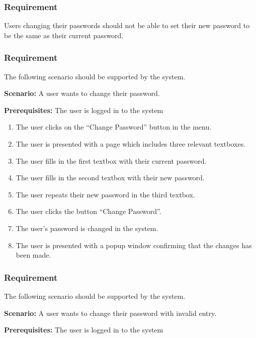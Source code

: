 \documentclass{article}
\begin{document}
\subsubsection{Requirement}
Users changing their passwords should not be able to set their new password to be the same as their current password.

\subsubsection{Requirement}
The following scenario should be supported by the system.

\textbf{Scenario:} A user wants to change their password.

\textbf{Prerequisites:} The user is logged in to the system

\begin{enumerate}
    \item The user clicks on the “Change Password” button in the menu.
    \item The user is presented with a page which includes three relevant textboxes.
    \item The user fills in the first textbox with their current password.
    \item The user fills in the second textbox with their new password.
    \item The user repeats their new password in the third textbox.
    \item The user clicks the button “Change Password”.
    \item The user's password is changed in the system.
    \item The user is presented with a popup window confirming that the changes has been made.
\end{enumerate}



\subsubsection{Requirement}
The following scenario should be supported by the system.

\textbf{Scenario:} A user wants to change their password with invalid entry.

\textbf{Prerequisites:} The user is logged in to the system
\end{document}
